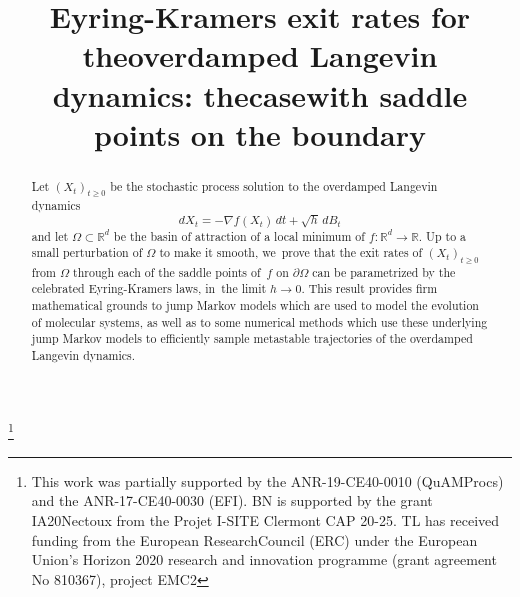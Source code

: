 \documentclass[JEP,XML,SOM,Unicode,NoEqCountersInSection,NoFloatCountersInSection,published]{cedram}
\theoremstyle{plain}
\theoremstyle{definition}
\begin{document}
\frontmatter

\title[Eyring-Kramers exit rates for the overdamped Langevin dynamics]{Eyring-Kramers exit rates for the\nobreakspace overdamped Langevin dynamics: the\nobreakspace case\nobreakspace with saddle points on the boundary}

\author[\initial{T.} \lastname{Lelièvre}]{ }
\address{École Nationale des Ponts et Chaussées - Institut Polytechnique de Paris, CERMICS \& Inria,\\
6 et 8 avenue Blaise Pascal, Cité Descartes, Champs-sur-Marne,
77455 Marne-la-Vallée Cedex 2, France}

\author[\initial{D.} \lastname{Le Peutrec}]{ }
\address{Laboratoire de Mathématiques Jean Leray, Nantes Université,\\
2 Chemin de la Houssinière, 44 322 Nantes Cedex 3, France}

\author[\initial{B.} \lastname{Nectoux}]{ }
\address{Université Clermont Auvergne, LMBP,\\
Avenue des landais, 63177 Aubiere cedex, France}

\thanks{This work was partially supported by the ANR-19-CE40-0010 (QuAMProcs) and the ANR-17-CE40-0030 (EFI). BN is supported by the grant IA20Nectoux from the Projet I-SITE Clermont CAP 20-25. TL has received funding from the European ResearchCouncil (ERC) under the European Union’s Horizon 2020 research and innovation programme (grant agreement No 810367), project EMC2}

\begin{abstract}
Let $(X_t)_{t\ge 0}$ be the stochastic process solution to the overdamped Langevin dynamics
\[
dX_t=-\nabla f(X_t) \, dt +\sqrt h \, dB_t
\]
and let $\Omega \subset \mathbb R^d $ be the basin of attraction of a local minimum of $f: \mathbb R^d \to \mathbb R$. Up to a small perturbation of $\Omega$ to make it smooth, we~prove that the exit rates of $(X_t)_{t\ge 0}$ from $\Omega$ through each of the saddle points of~$f$ on $\partial \Omega$ can be parametrized by the celebrated Eyring-Kramers laws, in~the limit $h \to 0$. This result provides firm mathematical grounds to jump Markov models which are used to model the evolution of molecular systems, as well as to some numerical methods which use these underlying jump Markov models to efficiently sample metastable trajectories of the overdamped Langevin dynamics.
\end{abstract}
\end{document}
